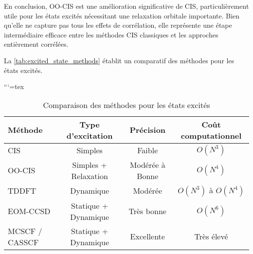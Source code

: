 \documentclass[12pt,a4paper]{report}
\begin{document}
\begin{markdown}
En conclusion, OO-CIS est une amélioration significative de CIS, particulièrement utile pour les états excités nécessitant une relaxation orbitale importante. Bien qu'elle ne capture pas tous les effets de corrélation, elle représente une étape intermédiaire efficace entre les méthodes CIS classiques et les approches entièrement corrélées. 

La \autoref{tab:excited_state_methods} établit un comparatif des méthodes pour les états excités.

```{=tex}
\begin{table}[htpb]
\centering
\caption{Comparaison des méthodes pour les états excités}
\begin{tabular}{@{}lccc@{}}
\toprule
\textbf{Méthode}         & \textbf{Type d’excitation}   & \textbf{Précision}   & \textbf{Coût computationnel} \\ \midrule
CIS                      & Simples                     & Faible               & $O(N^3)$                     \\
OO-CIS                   & Simples + Relaxation        & Modérée à Bonne      & $O(N^4)$                     \\
TDDFT                    & Dynamique                   & Modérée              & $O(N^3)$ à $O(N^4)$          \\
EOM-CCSD                 & Statique + Dynamique        & Très bonne           & $O(N^6)$                     \\
MCSCF / CASSCF           & Statique + Dynamique        & Excellente           & Très élevé                    \\ \bottomrule
\end{tabular}
\label{tab:excited_state_methods}
\end{table}




\end{markdown}
\end{document}
